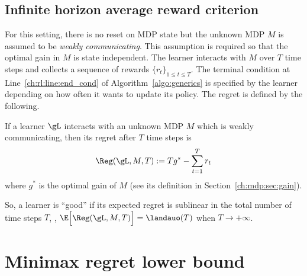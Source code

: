 \subsection{Infinite horizon average reward criterion}
For this setting, there is no reset on MDP state but the unknown MDP $M$ is assumed to be \emph{weakly communicating}.
This assumption is required so that the optimal gain in $M$ is state independent.
The learner interacts with $M$ over $T$ time steps and collects a sequence of rewards $\{r_t\}_{1\le t\le T}$.
The terminal condition at Line~\ref{ch:rl:line:end_cond} of Algorithm~\ref{algo:generics} is specified by the learner depending on how often it wants to update its policy.
The regret is defined by the following.
\begin{defn}
    If a learner $\gL$ interacts with an unknown MDP $M$ which is weakly communicating, then its regret after $T$ time steps is
    \begin{equation}
        \label{eq:rg_infinite}
        \Reg(\gL, M, T):= Tg^* -\sum_{t=1}^Tr_t
    \end{equation}
    where $g^*$ is the optimal gain of $M$ (see its definition in Section~\ref{ch:mdp:sec:gain}).
    \label{ch:rl:defn:rg_infinite}
\end{defn}
So, a learner is ``good'' if its expected regret is sublinear in the total number of time steps $T$, \ie, $\E\Big[\Reg(\gL, M, T)\Big]= \landauo(T)$ when $T\to+\infty$.




\section{Minimax regret lower bound}
\label{ch:rl:sec:baseline}

